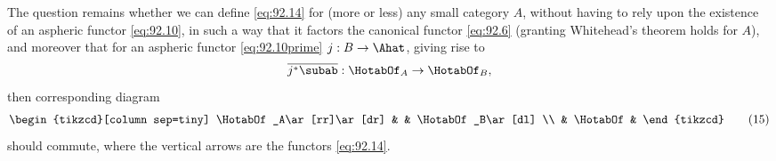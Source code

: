 The question remains whether we can define \eqref{eq:92.14} for (more
or less) any small category $A$, without having to rely upon the
existence of an aspheric functor \eqref{eq:92.10}, in such
a way that it factors the canonical functor \eqref{eq:92.6} (granting
Whitehead's theorem holds for $A$), and moreover that for an aspheric
functor \eqref{eq:92.10prime} $j:B\to\Ahat$, giving rise to
\[\overline{j^*\subab}:\HotabOf_A\to\HotabOf_B,\]
then corresponding diagram
\begin{equation}
  \label{eq:92.15}
  \begin{tikzcd}[column sep=tiny]
    \HotabOf_A\ar[rr]\ar[dr] & & \HotabOf_B\ar[dl] \\ & \HotabOf &
  \end{tikzcd}\tag{15}
\end{equation}
should commute, where the vertical arrows are the functors
\eqref{eq:92.14}.

